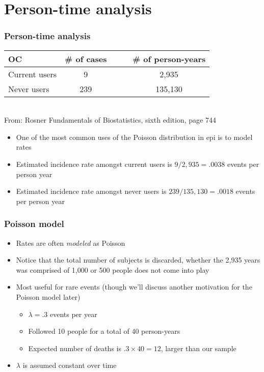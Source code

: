 \documentclass[aspectratio=169]{beamer}
\begin{document}
\section{Person-time analysis}
\begin{frame}\frametitle{Person-time analysis}
\begin{center}
  \ttfamily
  \begin{tabular}{lccc}
    OC        & \# of cases & ~~&\# of person-years \\ \hline
Current users & 9         & & 2,935        \\
Never   users & 239       & & 135,130      \\ \hline
  \end{tabular}\\
From: Rosner Fundamentals of Biostatistics, sixth edition, page 744
\end{center}
\begin{itemize}
\item One of the most common uses of the Poisson distribution in 
  epi is to model rates
\item Estimated incidence rate amongst current users is $9/2,935 = .0038$
  events per person year
\item Estimated incidence rate amongst never users is $239 / 135,130 =
  .0018$ events per person year
\end{itemize}
\end{frame}

\begin{frame}\frametitle{Poisson model}
\begin{itemize}
\item Rates are often {\em modeled} as Poisson
\item Notice that the total number of subjects is discarded, whether
  the 2,935 years was comprised of 1,000 or 500 people does not come
  into play
\item Most useful for rare events (though we'll discuss another motivation for the
  Poisson model later)
  \begin{itemize}
  \item $\lambda = .3$ events per year
  \item Followed 10 people for a total of 40 person-years
  \item Expected number of deaths is $.3\times 40 = 12$, larger than our sample
  \end{itemize}
\item $\lambda$ is assumed constant over time
\end{itemize}
\end{frame}
\end{document}

